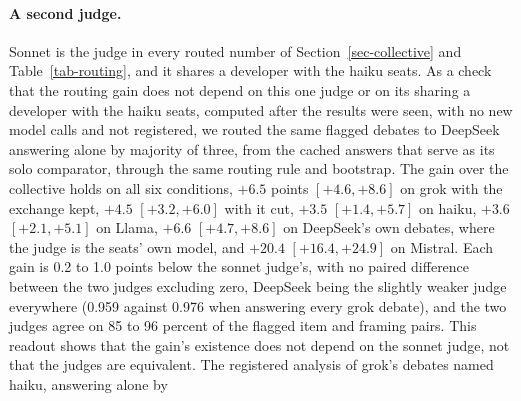 \paragraph{A second judge.}
Sonnet is the judge in every routed number of Section~\ref{sec-collective}
and Table~\ref{tab-routing}, and it shares a developer with the haiku seats.
As a check that the routing gain does not depend on this one judge or on its
sharing a developer with the haiku seats, computed after the results were
seen, with no new model calls and not registered, we routed the same flagged
debates to DeepSeek answering alone by majority of three, from the cached
answers that serve as its solo comparator, through the same routing rule and
bootstrap. The gain over the collective holds on all six conditions, $+6.5$
points $[+4.6, +8.6]$ on grok with the exchange kept, $+4.5$ $[+3.2, +6.0]$
with it cut, $+3.5$ $[+1.4, +5.7]$ on haiku, $+3.6$ $[+2.1, +5.1]$ on Llama,
$+6.6$ $[+4.7, +8.6]$ on DeepSeek's own debates, where the judge is the
seats' own model, and $+20.4$ $[+16.4, +24.9]$ on Mistral. Each gain is 0.2
to 1.0 points below the sonnet judge's, with no paired difference between
the two judges excluding zero, DeepSeek being the slightly weaker judge
everywhere (0.959 against 0.976 when answering every grok debate), and the
two judges agree on 85 to 96 percent of the flagged item and framing pairs.
This readout shows that the gain's existence does not depend on the sonnet
judge, not that the judges are equivalent.
The registered analysis of grok's debates named haiku, answering alone by
